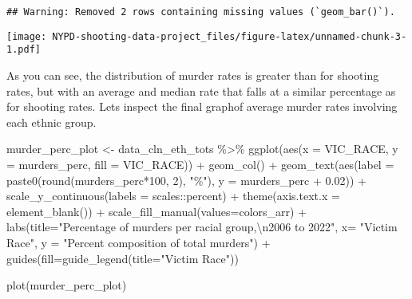 \documentclass[
]{article}
\newenvironment{Shaded}{\begin{snugshade}}{\end{snugshade}}
\newcommand{\AttributeTok}[1]{\textcolor[rgb]{0.77,0.63,0.00}{#1}}
\newcommand{\DecValTok}[1]{\textcolor[rgb]{0.00,0.00,0.81}{#1}}
\newcommand{\FloatTok}[1]{\textcolor[rgb]{0.00,0.00,0.81}{#1}}
\newcommand{\FunctionTok}[1]{\textcolor[rgb]{0.00,0.00,0.00}{#1}}
\newcommand{\NormalTok}[1]{#1}
\newcommand{\OtherTok}[1]{\textcolor[rgb]{0.56,0.35,0.01}{#1}}
\newcommand{\SpecialCharTok}[1]{\textcolor[rgb]{0.00,0.00,0.00}{#1}}
\newcommand{\StringTok}[1]{\textcolor[rgb]{0.31,0.60,0.02}{#1}}
\begin{document}
\begin{verbatim}
## Warning: Removed 2 rows containing missing values (`geom_bar()`).
\end{verbatim}

\texttt{[image: NYPD-shooting-data-project\_files/figure-latex/unnamed-chunk-3-1.pdf]}

As you can see, the distribution of murder rates is greater than for
shooting rates, but with an average and median rate that falls at a
similar percentage as for shooting rates. Lets inspect the final graphof
average murder rates involving each ethnic group.

\begin{Shaded}
\begin{Highlighting}[]
\NormalTok{murder\_perc\_plot }\OtherTok{\textless{}{-}}\NormalTok{ data\_cln\_eth\_tots }\SpecialCharTok{\%\textgreater{}\%} \FunctionTok{ggplot}\NormalTok{(}\FunctionTok{aes}\NormalTok{(}\AttributeTok{x =}\NormalTok{ VIC\_RACE, }\AttributeTok{y =}\NormalTok{ murders\_perc, }\AttributeTok{fill =}\NormalTok{ VIC\_RACE)) }\SpecialCharTok{+} \FunctionTok{geom\_col}\NormalTok{() }\SpecialCharTok{+} \FunctionTok{geom\_text}\NormalTok{(}\FunctionTok{aes}\NormalTok{(}\AttributeTok{label =} \FunctionTok{paste0}\NormalTok{(}\FunctionTok{round}\NormalTok{(murders\_perc}\SpecialCharTok{*}\DecValTok{100}\NormalTok{, }\DecValTok{2}\NormalTok{), }\StringTok{"\%"}\NormalTok{), }\AttributeTok{y =}\NormalTok{ murders\_perc }\SpecialCharTok{+} \FloatTok{0.02}\NormalTok{)) }\SpecialCharTok{+} \FunctionTok{scale\_y\_continuous}\NormalTok{(}\AttributeTok{labels =}\NormalTok{ scales}\SpecialCharTok{::}\NormalTok{percent) }\SpecialCharTok{+}  \FunctionTok{theme}\NormalTok{(}\AttributeTok{axis.text.x =} \FunctionTok{element\_blank}\NormalTok{()) }\SpecialCharTok{+} \FunctionTok{scale\_fill\_manual}\NormalTok{(}\AttributeTok{values=}\NormalTok{colors\_arr) }\SpecialCharTok{+} \FunctionTok{labs}\NormalTok{(}\AttributeTok{title=}\StringTok{"Percentage of murders per racial group,}\SpecialCharTok{\textbackslash{}n}\StringTok{2006 to 2022"}\NormalTok{, }\AttributeTok{x=} \StringTok{"Victim Race"}\NormalTok{, }\AttributeTok{y =} \StringTok{"Percent composition of total murders"}\NormalTok{) }\SpecialCharTok{+} \FunctionTok{guides}\NormalTok{(}\AttributeTok{fill=}\FunctionTok{guide\_legend}\NormalTok{(}\AttributeTok{title=}\StringTok{"Victim Race"}\NormalTok{))}

\FunctionTok{plot}\NormalTok{(murder\_perc\_plot)}
\end{Highlighting}
\end{Shaded}
\end{document}
